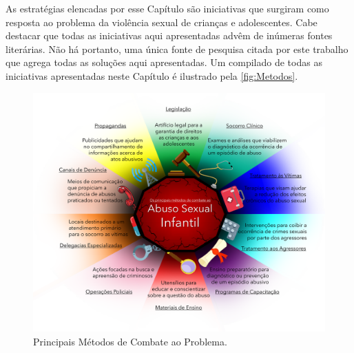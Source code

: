 As estratégias elencadas por esse Capítulo são iniciativas que surgiram como resposta ao problema da violência sexual de crianças e adolescentes. Cabe destacar que todas as iniciativas aqui apresentadas advêm de inúmeras fontes literárias. Não há portanto, uma única fonte de pesquisa citada por este trabalho que agrega todas as soluções aqui apresentadas. Um compilado de todas as iniciativas apresentadas neste Capítulo é ilustrado pela \autoref{fig:Metodos}.




\begin{figure}[htb]
  
	\caption{\label{fig:Metodos}Principais Métodos de Combate ao Problema.}\vspace{-0.2cm}
  \begin{adjustwidth}{-4.2cm}{-0.0cm}
    \includegraphics[scale=0.65]{./Figuras/MétodosCombate.pdf}
	\end{adjustwidth}\vspace{-1.5cm}

\end{figure}

\newpage



